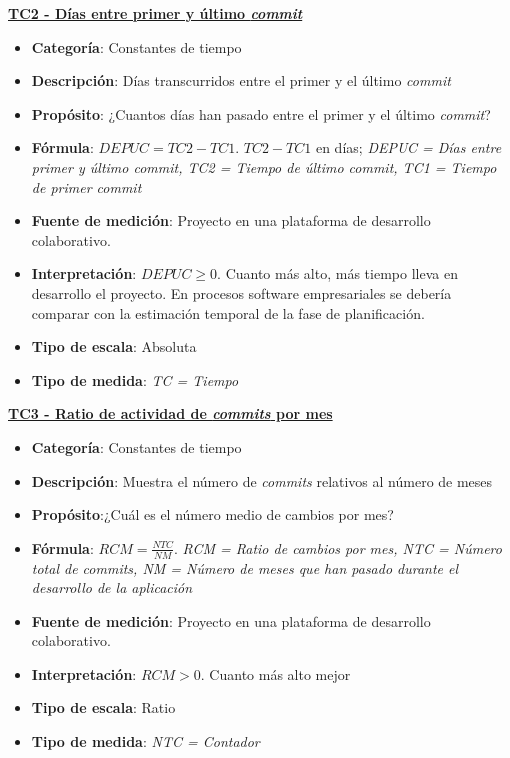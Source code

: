 \textbf{\underline{TC2 - Días entre primer y último \textit{commit}}}

\begin{itemize}
	\item \textbf{Categoría}: Constantes de tiempo
	\item \textbf{Descripción}: Días transcurridos entre el primer y el último \textit{commit} 
	\item \textbf{Propósito}: ¿Cuantos días han pasado entre el primer y el último \textit{commit}?
	\item \textbf{Fórmula}: $DEPUC = TC2- TC1$. $TC2- TC1$ en días;  \textit{DEPUC = Días entre primer y último \textit{commit}, TC2 = Tiempo de último \textit{commit}, TC1 = Tiempo de primer \textit{commit}}
	\item \textbf{Fuente de medición}: Proyecto en una plataforma de desarrollo colaborativo.
	\item \textbf{Interpretación}: $DEPUC \geq 0$. Cuanto más alto, más tiempo lleva en desarrollo el proyecto. En procesos software empresariales se debería comparar con la estimación temporal de la fase de planificación. 
	\item \textbf{Tipo de escala}: Absoluta
	\item \textbf{Tipo de medida}: \textit{TC = Tiempo}
\end{itemize}

\textbf{\underline{TC3 - Ratio de actividad de \textit{commits} por mes}}

\begin{itemize}
	\item \textbf{Categoría}: Constantes de tiempo
	\item \textbf{Descripción}: Muestra el número de \textit{commits} relativos al número de meses
	\item \textbf{Propósito}:¿Cuál es el número medio de cambios por mes?
	\item \textbf{Fórmula}: $RCM = \frac{NTC}{NM}$. \textit{RCM = Ratio de cambios por mes, NTC = Número total de \textit{commits}, NM = Número de meses que han pasado durante el desarrollo de la aplicación}
	\item \textbf{Fuente de medición}: Proyecto en una plataforma de desarrollo colaborativo.
	\item \textbf{Interpretación}: $RCM > 0$. Cuanto más alto mejor
	\item \textbf{Tipo de escala}: Ratio
	\item \textbf{Tipo de medida}: \textit{NTC = Contador}
\end{itemize}


